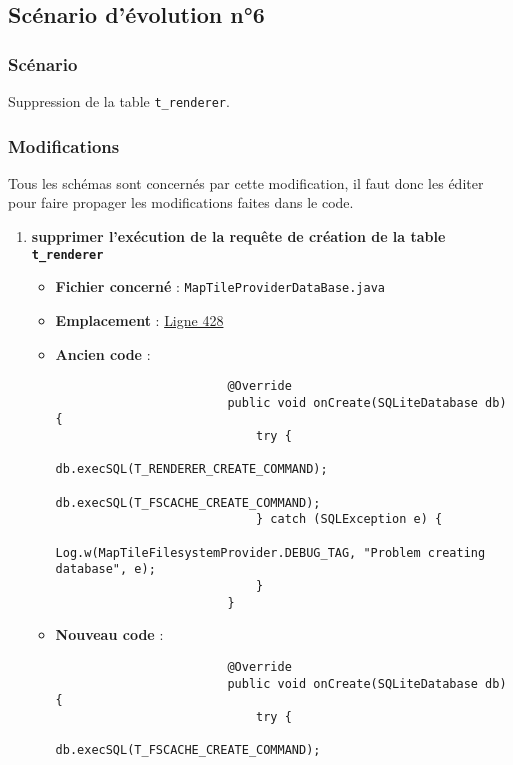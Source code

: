 \subsection{Scénario d'évolution n°6}
\subsubsection{Scénario}
Suppression de la table \texttt{t_renderer}.

\subsubsection{Modifications}
Tous les schémas sont concernés par cette modification, il faut donc les éditer pour faire propager les modifications faites dans le code.

\begin{enumerate}
    \item \textbf{supprimer l'exécution de la requête de création de la table \texttt{t_renderer}}
          \begin{itemize}
              \item \textbf{Fichier concerné} : \texttt{MapTileProviderDataBase.java}
              \item \textbf{Emplacement} :
                    \href{https://github.com/MarcusWolschon/osmeditor4android/blob/127fb689ad42c77558e4512e14de754e0561cd27/src/main/java/de/blau/android/services/util/MapTileProviderDataBase.java#L428}{Ligne 428}
              \item \textbf{Ancien code} :
                    \begin{verbatim}
                        @Override
                        public void onCreate(SQLiteDatabase db) {
                            try {
                                db.execSQL(T_RENDERER_CREATE_COMMAND);
                                db.execSQL(T_FSCACHE_CREATE_COMMAND);
                            } catch (SQLException e) {
                                Log.w(MapTileFilesystemProvider.DEBUG_TAG, "Problem creating database", e);
                            }
                        }
                    \end{verbatim}
              \item \textbf{Nouveau code} :
                    \begin{verbatim}
                        @Override
                        public void onCreate(SQLiteDatabase db) {
                            try {
                                db.execSQL(T_FSCACHE_CREATE_COMMAND);

\end{verbatim}
\end{itemize}
\end{enumerate}
